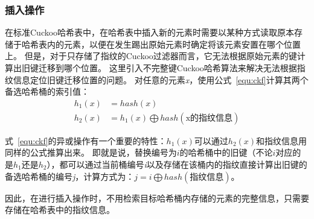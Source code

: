 \subsubsection{插入操作}
\label{sec:insert}
在标准Cuckoo哈希表中，在哈希表中插入新的元素时需要以某种方式读取原本存储于哈希表内的元素，以便在发生踢出原始元素时确定将该元素安置在哪个位置上。
但是，对于只存储了指纹的Cuckoo过滤器而言，它无法根据原始元素的键计算出旧键迁移到哪个位置。
这里引入不完整键Cuckoo哈希算法来解决无法根据指纹信息定位旧键迁移位置的问题。
对任意的元素\textit{x}，使用公式~\ref{equ:ckf}计算其两个备选哈希桶的索引值：
\begin{equation}
\begin{split}
h_1\left(x\right) &= hash\left(x\right) \\
h_2(x) &= h_1(x)\bigoplus hash(\text{x的指纹信息})
\end{split}
\label{equ:ckf}
\end{equation}

式~\ref{equ:ckf}的异或操作有一个重要的特性：$h_1(x)$可以通过$h_2(x)$和指纹信息用同样的公式推算出来。
即就是说，替换编号为$i$的哈希桶中的旧键（不论$i$对应的是$h_1$还是$h_2$），都可以通过当前桶编号\textit{i}以及存储在该桶内的指纹直接计算出旧键的备选哈希桶的编号\textit{j}，计算方式为：$j = i \bigoplus hash(\text{指纹信息})$。

因此，在进行插入操作时，不用检索目标哈希桶内存储的元素的完整信息，只需要存储在哈希表中的指纹信息。

